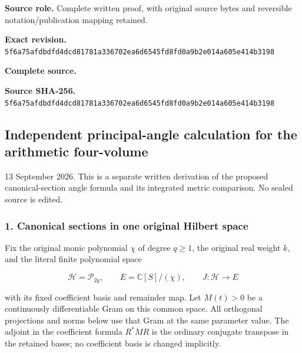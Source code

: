 \documentclass{article}
\begin{document}
\maketitle
\begingroup
\sloppy
\small

\noindent\textbf{Source role.} Complete written proof, with original source bytes and reversible notation/publication mapping retained.\par
\noindent\textbf{Exact revision.} \nolinkurl{5f6a75afdbdfd4dcd81781a336702ea6d6545fd8fd0a9b2e014a605e414b3198}\par
\noindent\textbf{Complete source.} \par
\noindent\textbf{Source SHA-256.} \nolinkurl{5f6a75afdbdfd4dcd81781a336702ea6d6545fd8fd0a9b2e014a605e414b3198}\par\medskip
\subsection{Independent principal-angle calculation for the arithmetic four-volume}\label{endpoint-principal_angle_volume_review--independent-principal-angle-calculation-for-the-arithmetic-four-volume}

13 September 2026. This is a separate written derivation of the proposed canonical-section angle formula and its integrated metric comparison. No sealed source is edited.

\subsubsection{1. Canonical sections in one original Hilbert space}\label{endpoint-principal_angle_volume_review--canonical-sections-in-one-original-hilbert-space}

Fix the original monic polynomial \(\chi\) of degree \(q\ge1\), the original real weight \(k\), and the literal finite polynomial space

\[
\mathcal H=\mathcal P_{2q},\qquad
E=\mathbb C[S]/(\chi),\qquad
J:\mathcal H\longrightarrow E
\tag{PA1}
\]

with its fixed coefficient basis and remainder map. Let \(M(t)>0\) be a continuously differentiable Gram on this common space. All orthogonal projections and norms below use that Gram at the same parameter value. The adjoint in the coefficient formula \(R^*MR\) is the ordinary conjugate transpose in the retained bases; no coefficient basis is changed implicitly.
\end{document}
